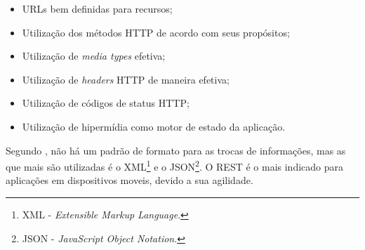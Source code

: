 			\begin{itemize}
			  
			  \item URLs bem definidas para recursos;
			  
			  \item Utilização dos métodos HTTP de acordo com seus propósitos;
			  
			  \item Utilização de \textit{media types} efetiva;
			  
			  \item Utilização de \textit{headers} HTTP de maneira efetiva;
			  
			  \item Utilização de códigos de status HTTP;
			  
			  \item Utilização de hipermídia como motor de estado da aplicação.
			
			\end{itemize}
			 
			\par Segundo , não há um padrão de formato para as
		 trocas de informações, mas as que mais são utilizadas é o XML\footnote{XML
		 - \textit{Extensible Markup Language}.} e o JSON\footnote{JSON - 
		 \textit{JavaScript Object Notation}.}. O REST é o mais indicado para aplicações
		 em dispositivos moveis, devido a sua agilidade.